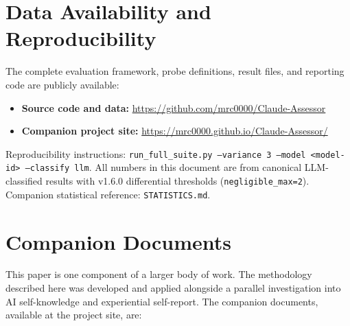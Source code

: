 \documentclass[11pt,a4paper]{article}
\begin{document}
\section*{Data Availability and Reproducibility}

The complete evaluation framework, probe definitions, result files, and reporting code are publicly available:

\begin{itemize}[leftmargin=2em]
    \item \textbf{Source code and data:} \url{https://github.com/mrc0000/Claude-Assessor}
    \item \textbf{Companion project site:} \url{https://mrc0000.github.io/Claude-Assessor/}
\end{itemize}

\noindent Reproducibility instructions: \texttt{run\_full\_suite.py --variance 3 --model <model-id> --classify llm}. All numbers in this document are from canonical LLM-classified results with v1.6.0 differential thresholds (\texttt{negligible\_max=2}). Companion statistical reference: \texttt{STATISTICS.md}.


\section*{Companion Documents}

This paper is one component of a larger body of work. The methodology described here was developed and applied alongside a parallel investigation into AI self-knowledge and experiential self-report. The companion documents, available at the project site, are:
\end{document}
